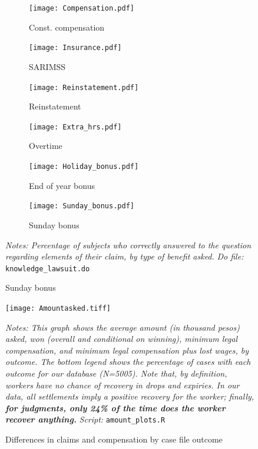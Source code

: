 \documentclass[11pt]{article}
\begin{document}
\begin{figure}[H]
    \caption{Knowledge about their own claims in lawsuit}
    \label{Knowtheirclaimsfig}
    \begin{center}
        \begin{subfigure}{0.49\textwidth}
            \caption{Const. compensation}
            \centering
            \texttt{[image: Compensation.pdf]}
        \end{subfigure}
        \begin{subfigure}{0.49\textwidth}
            \caption{SARIMSS}
                \centering
                \texttt{[image: Insurance.pdf]}
        \end{subfigure}
        \begin{subfigure}{0.49\textwidth}
            \caption{Reinstatement}
            \centering
            \texttt{[image: Reinstatement.pdf]}
        \end{subfigure}
            \hfill
        \begin{subfigure}{0.49\textwidth}
            \caption{Overtime}
            \centering
            \texttt{[image: Extra\_hrs.pdf]}
        \end{subfigure}
        \begin{subfigure}{0.49\textwidth}
            \caption{End of year bonus}
            \centering
            \texttt{[image: Holiday\_bonus.pdf]}
        \end{subfigure}
            \hfill
        \begin{subfigure}{0.49\textwidth}
            \caption{Sunday bonus}
            \centering
            \texttt{[image: Sunday\_bonus.pdf]}
        \end{subfigure}
    \end{center} 
        \footnotesize \textit{Notes: Percentage of subjects who correctly answered to the question regarding elements of their claim, by type of benefit asked.}
        {\footnotesize \textit{Do file: }  \texttt{knowledge\_lawsuit.do}}
\end{figure}

 
    
\begin{figure}[H]
    \caption{Differences in claims and compensation by case file outcome}
    \label{claimsvsoutcomes}
    \begin{center}
        \texttt{[image: Amountasked.tiff]}
        \end{center}
    \footnotesize \textit{Notes: This graph shows the average amount (in thousand pesos) asked, won (overall and conditional on winning), minimum legal compensation, and minimum legal compensation plus lost wages, by outcome. The bottom legend shows the percentage of cases with each outcome for our database (N=5005). Note that, by definition, workers have no chance of recovery in drops and expiries. In our data, all settlements imply a positive recovery for the worker; finally, \textbf{for judgments, only 24\% of the time does the worker recover anything.}} 
    {\footnotesize \textit{Script: } \texttt{amount\_plots.R}}
\end{figure}
\end{document}
